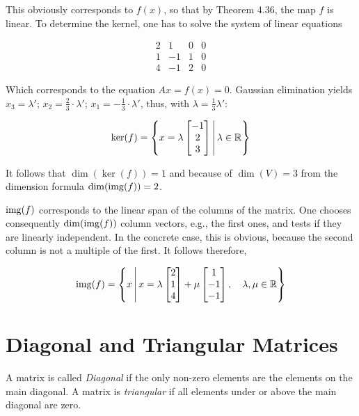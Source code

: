 This obviously corresponds to \(f(x)\), so that by Theorem 4.36, the map \(f\) is linear. To determine the kernel, one has to solve the 
system of linear equations

\[
    \begin{array}{cccc}
        2 & 1  & 0 & 0 \\
        1 & -1 & 1 & 0 \\
        4 & -1 & 2 & 0
    \end{array}
\]

Which corresponds to the equation \(Ax = f(x) = 0\). Gaussian elimination yields \(x_3 = \lambda'\);
\(x_2 = \frac{2}{3} \cdot \lambda'\); \(x_1 = -\frac{1}{3} \cdot \lambda'\), thus, with \(\lambda = \frac{1}{3} \lambda'\):

\[
    \ker(f) =
    \left\{
    x = \lambda
    \begin{bmatrix}
        -1 \\
        2  \\
        3
    \end{bmatrix}
    \, \middle| \, \lambda \in \mathbb{R}
    \right\}
\]

It follows that \(\dim(\ker(f)) = 1\) and because of \(\dim(V) = 3\) from the dimension
formula \(\dim(\mathrm{img}(f)) = 2\).

\(\mathrm{img}(f)\) corresponds to the linear span of the columns of the matrix. One chooses consequently \(\dim(\mathrm{img}(f))\) column vectors, e.g., the 
first ones, and tests if they are linearly independent. In the concrete case, this is obvious, because the second column is
not a multiple of the first. It follows therefore,

\[
    \mathrm{img}(f) =
    \left\{
    x \, \middle| \, x = \lambda
    \begin{bmatrix}
        2 \\
        1 \\
        4
    \end{bmatrix} + \mu
    \begin{bmatrix}
        1  \\
        -1 \\
        -1
    \end{bmatrix}
    , \quad \lambda, \mu \in \mathbb{R}
    \right\}
\]

\section{Diagonal and Triangular Matrices}

A matrix is called \emph{Diagonal} if the only non-zero elements are the elements on the main diagonal. A matrix is \emph{triangular} if all 
elements under or above the main diagonal are zero.

